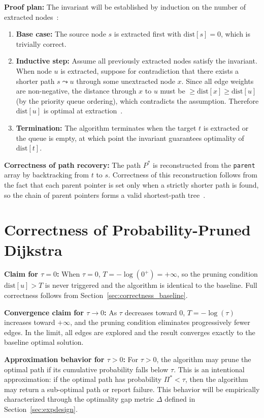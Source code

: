 \textbf{Proof plan:} The invariant will be established by induction on the number of extracted nodes~\citep{cormen2009,dijkstra1959}:
\begin{enumerate}
    \item \textbf{Base case:} The source node $s$ is extracted first with $\text{dist}[s] = 0$, which is trivially correct.
    \item \textbf{Inductive step:} Assume all previously extracted nodes satisfy the invariant. When node $u$ is extracted, suppose for contradiction that there exists a shorter path $s \leadsto u$ through some unextracted node $x$. Since all edge weights are non-negative, the distance through $x$ to $u$ must be $\geq \text{dist}[x] \geq \text{dist}[u]$ (by the priority queue ordering), which contradicts the assumption. Therefore $\text{dist}[u]$ is optimal at extraction~\citep{cormen2009}.
    \item \textbf{Termination:} The algorithm terminates when the target $t$ is extracted or the queue is empty, at which point the invariant guarantees optimality of $\text{dist}[t]$.
\end{enumerate}

\textbf{Correctness of path recovery:} The path $P^*$ is reconstructed from the \texttt{parent} array by backtracking from $t$ to $s$. Correctness of this reconstruction follows from the fact that each parent pointer is set only when a strictly shorter path is found, so the chain of parent pointers forms a valid shortest-path tree~\citep{cormen2009}.

\section{Correctness of Probability-Pruned Dijkstra}

\textbf{Claim for $\tau = 0$:} When $\tau = 0$, $T = -\log(0^+) = +\infty$, so the pruning condition $\text{dist}[u] > T$ is never triggered and the algorithm is identical to the baseline. Full correctness follows from Section~\ref{sec:correctness_baseline}.

\textbf{Convergence claim for $\tau \to 0$:} As $\tau$ decreases toward 0, $T = -\log(\tau)$ increases toward $+\infty$, and the pruning condition eliminates progressively fewer edges. In the limit, all edges are explored and the result converges exactly to the baseline optimal solution.

\textbf{Approximation behavior for $\tau > 0$:} For $\tau > 0$, the algorithm may prune the optimal path if its cumulative probability falls below $\tau$. This is an intentional approximation: if the optimal path has probability $\Pi^* < \tau$, then the algorithm may return a sub-optimal path or report failure. This behavior will be empirically characterized through the optimality gap metric $\Delta$ defined in Section~\ref{sec:expdesign}.

